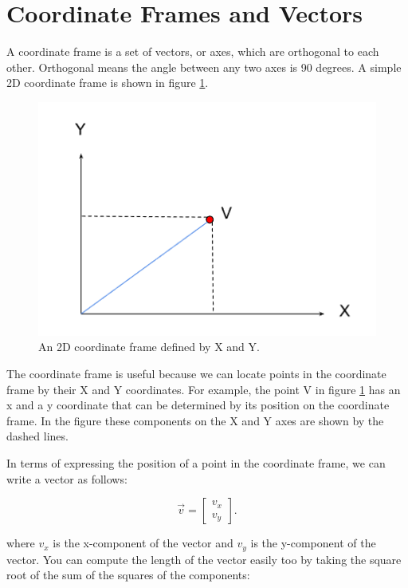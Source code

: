 \documentclass[11pt]{article}
\begin{document}
\section{Coordinate Frames and Vectors}
\label{sec:coordinateframes}

A coordinate frame is a set of vectors, or axes, which are orthogonal to each other.  Orthogonal
means the angle between any two axes is 90 degrees.  A simple 2D coordinate frame is shown in figure \ref{fig:cf1}.

\begin{figure}[h!]
    \centering
    \includegraphics{figures/cf1.png}
    \caption{An 2D coordinate frame defined by X and Y.}
    \label{fig:cf1}
\end{figure}

The coordinate frame is useful because we can locate points in the coordinate frame by their X
and Y coordinates.  For example, the point V in figure \ref{fig:cf1} has an x and a y coordinate
that can be determined by its position on the coordinate frame.  In the figure these components
on the X and Y axes are shown by the dashed lines.

In terms of expressing the position of a point in the coordinate frame, we can write a vector as follows:

\begin{equation}
\vec{v} = 
\begin{bmatrix}
v_x \\
v_y
\end{bmatrix}.
\end{equation}

where \(v_x\) is the x-component of the vector and \(v_y\) is the y-component of the vector.  You can
compute the length of the vector easily too by taking the square root of the sum of the
squares of the components:
\end{document}
